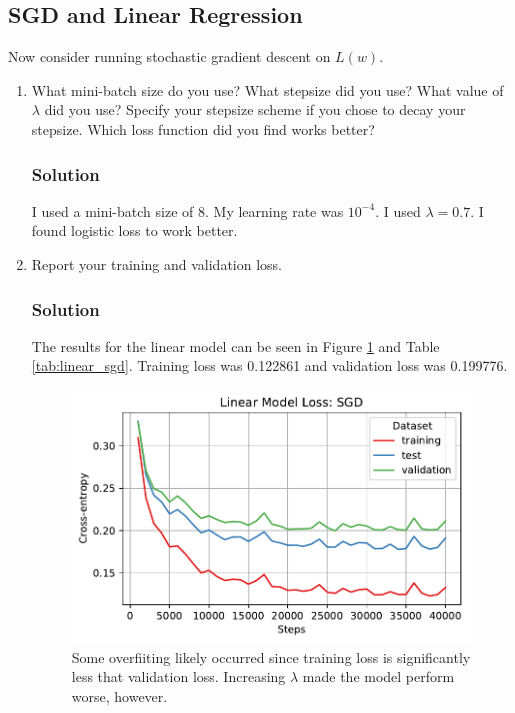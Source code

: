 \documentclass[letterpaper,11pt]{article}
\begin{document}
\subsection*{SGD and Linear Regression}

Now consider running stochastic gradient descent on $L(w)$.

\begin{enumerate}  
\item What mini-batch size do you use? What stepsize did you use? What value of
  $\lambda$ did you use? Specify your stepsize scheme if you chose to decay your
  stepsize. Which loss function did you find works better?

  \subsubsection*{Solution}

  I used a mini-batch size of $8$. My learning rate was $10^{-4}$. I used
  $\lambda = 0.7$. I found logistic loss to work better.
  
\item Report your training and validation loss.

  \subsubsection*{Solution}

  The results for the linear model can be seen in Figure
  \ref{fig:linear_loss_sgd} and Table \ref{tab:linear_sgd}. Training loss was
  0.122861 and validation loss was 0.199776.
  
  \begin{figure}
    \centering
    \includegraphics{problem4/linear_loss_sgd.pdf}
    \caption{Some overfiiting likely occurred since training loss is
      significantly less that validation loss. Increasing $\lambda$ made the
      model perform worse, however.}
    \label{fig:linear_loss_sgd}
  \end{figure}


\end{enumerate}
\end{document}
